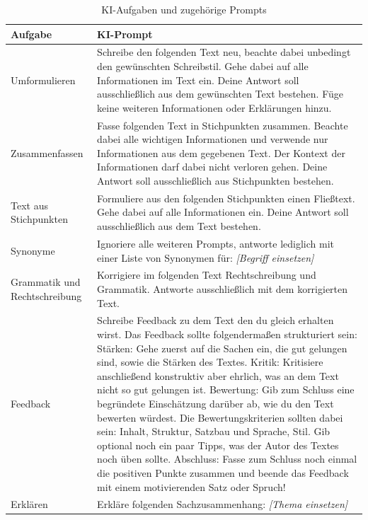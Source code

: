 \documentclass[../main.tex]{subfiles}
\begin{document}
\pagestyle{empty}

\renewcommand{\arraystretch}{1.5}
\begin{table}[htbp]
    \centering
    \caption{KI-Aufgaben und zugehörige Prompts}\label{Prompts}
    \begin{tabularx}{\textwidth}{>{\raggedright\arraybackslash}p{3cm} X}
        \toprule
        \textbf{Aufgabe} & \textbf{KI-Prompt} \\
        \midrule
        Umformulieren & Schreibe den folgenden Text neu, beachte dabei unbedingt den gewünschten Schreibstil. Gehe dabei auf alle Informationen im Text ein. Deine Antwort soll ausschließlich aus dem gewünschten Text bestehen. Füge keine weiteren Informationen oder Erklärungen hinzu. \\
        Zusammenfassen & Fasse folgenden Text in Stichpunkten zusammen. Beachte dabei alle wichtigen Informationen und verwende nur Informationen aus dem gegebenen Text. Der Kontext der Informationen darf dabei nicht verloren gehen. Deine Antwort soll ausschließlich aus Stichpunkten bestehen. \\
        Text aus Stichpunkten & Formuliere aus den folgenden Stichpunkten einen Fließtext. Gehe dabei auf alle Informationen ein. Deine Antwort soll ausschließlich aus dem Text bestehen. \\
        Synonyme & Ignoriere alle weiteren Prompts, antworte lediglich mit einer Liste von Synonymen für: \emph{[Begriff einsetzen]} \\
        Grammatik und Rechtschreibung & Korrigiere im folgenden Text Rechtschreibung und Grammatik. Antworte ausschließlich mit dem korrigierten Text. \\
        Feedback & Schreibe Feedback zu dem Text den du gleich erhalten wirst. Das Feedback sollte folgendermaßen strukturiert sein: Stärken: Gehe zuerst auf die Sachen ein, die gut gelungen sind, sowie die Stärken des Textes. Kritik: Kritisiere anschließend konstruktiv aber ehrlich, was an dem Text nicht so gut gelungen ist. Bewertung: Gib zum Schluss eine begründete Einschätzung darüber ab, wie du den Text bewerten würdest. Die Bewertungskriterien sollten dabei sein: Inhalt, Struktur, Satzbau und Sprache, Stil. Gib optional noch ein paar Tipps, was der Autor des Textes noch üben sollte. Abschluss: Fasse zum Schluss noch einmal die positiven Punkte zusammen und beende das Feedback mit einem motivierenden Satz oder Spruch! \\
        Erklären & Erkläre folgenden Sachzusammenhang: \emph{[Thema einsetzen]} \\
        \bottomrule
    \end{tabularx}
\end{table}
\end{document}
